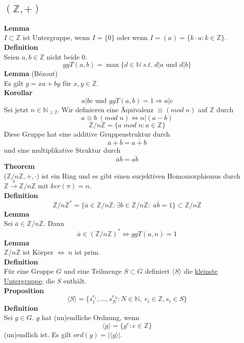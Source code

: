 \documentclass[a4paper, 12pt]{article}
\begin{document}
\subsection{$(\mathbb{Z}, +)$}
\textbf{Lemma}\\ $I\subset \mathbb{Z}$ ist Untergruppe, wenn $I = \{0\}$ oder wenn $I = (a) = \{k\cdot a: k \in \mathbb{Z}\}$.
\textbf{Definition}\\
Seien $a,b\in\mathbb{Z}$ nicht beide 0. \[ggT(a,b) = \max\{d \in \mathbb{N} \; s.t.\; d|a \text{ und } d|b\}\]
\textbf{Lemma} (Bézout)\\
Es gilt $g = xa+by$ für $x,y \in \mathbb{Z}$.\\
\textbf{Korollar}
\[a|bc \text{ und } ggT(a,b) = 1 \Rightarrow a|c\]
Sei jetzt $n \in \mathbb{N}_{\geq 2}$. Wir definieren eine Äquivalenz $\equiv (mod\; n)$ auf $\mathbb{Z}$ durch \[a\equiv b\; (mod\; n) \Leftrightarrow n|(a-b)\]
\[\mathbb{Z}/n\mathbb{Z} = \{a \;mod\; n: a\in\mathbb{Z}\}\]
Diese Gruppe hat eine additive Gruppenstruktur durch \[\overline{a} + \overline{b} = \overline{a+b}\] und eine multiplikative Struktur durch \[\overline{a}\overline{b} = \overline{ab}\]
\textbf{Theorem}\\
($\mathbb{Z}/n\mathbb{Z}, +, \cdot)$ ist ein Ring und es gibt einen surjektiven Homomorphismus durch $\mathbb{Z} \overset{\pi}{\to} \mathbb{Z}/n\mathbb{Z}$ mit $ker(\pi) = n$.\\
\textbf{Definition}\\
\[\mathbb{Z}/n\mathbb{Z}^* = \{\overline{a} \in \mathbb{Z}/n\mathbb{Z}: \exists b \in \mathbb{Z}/n\mathbb{Z}: \; \overline{a}\overline{b} = 1\} \subset \mathbb{Z}/n\mathbb{Z}\]
\textbf{Lemma}\\
Sei $\overline{a} \in \mathbb{Z}/n\mathbb{Z}$. Dann \[\overline{a} \in (\mathbb{Z}/n\mathbb{Z})^* \Leftrightarrow ggT(a,n) = 1\]
\textbf{Lemma}\\
$\mathbb{Z}/n\mathbb{Z}$ ist Körper $\Leftrightarrow\; n$ ist prim.\\
\textbf{Definition}\\
Für eine Gruppe $G$ und eine Teilmenge $S\subset G$ definiert $\langle S \rangle$ die \underline{kleinste Untergruppe}, die $S$ enthält.\\
\textbf{Proposition}
\[\langle S \rangle = \{s_1^{e_1}, ..., s_N^{e_N}: N \in \mathbb{N}, \; e_i \in \mathbb{Z}, s_i \in S\}\]
\textbf{Definition}\\
Sei $g\in G$. $g$ hat (un)endliche Ordnung, wenn \[\langle g \rangle = \{g^e: e \in \mathbb{Z}\}\]
(un)endlich ist. Es gilt $ord(g) = \left|\langle g \rangle \right|$.\\
\end{document}
